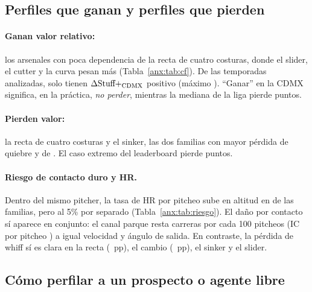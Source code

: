 \subsection{Perfiles que ganan y perfiles que pierden}

\paragraph{Ganan valor relativo:} los arsenales con poca dependencia de la recta de cuatro costuras, donde el slider, el cutter y la curva pesan más (Tabla~\ref{anx:tab:cf}). De las  temporadas analizadas, solo  tienen $\Delta\text{Stuff+}_{\text{CDMX}}$ positivo (máximo ). ``Ganar'' en la CDMX significa, en la práctica, \emph{no perder}, mientras la mediana de la liga pierde  puntos.

\paragraph{Pierden valor:} la recta de cuatro costuras y el sinker, las dos familias con mayor pérdida de quiebre y de \splus. El caso extremo del leaderboard pierde  puntos.

\paragraph{Riesgo de contacto duro y HR.} Dentro del mismo pitcher, la tasa de HR por pitcheo sube en altitud en  de las  familias, pero  al 5\% por separado (Tabla~\ref{anx:tab:riesgo}). El daño por contacto sí aparece en conjunto: el canal parque resta  carreras por cada 100 pitcheos (IC por pitcheo ) a igual velocidad y ángulo de salida. En contraste, la pérdida de whiff sí es clara en la recta (~pp), el cambio (~pp), el sinker y el slider.

\begin{table}[H]\centering\small
\caption{Riesgo por familia en \emph{Extreme} frente a \emph{No Altitude} (dentro del mismo pitcher, en puntos porcentuales por pitcheo).}\label{anx:tab:riesgo}
\end{table}

\subsection{Cómo perfilar a un prospecto o agente libre}

